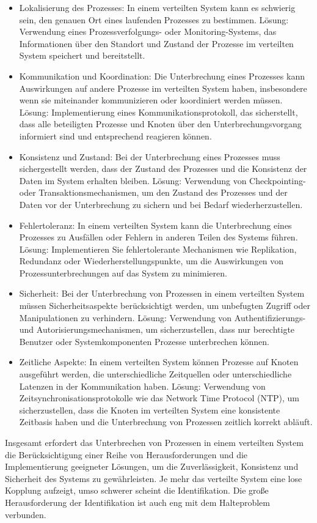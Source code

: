\begin{itemize}
\item Lokalisierung des Prozesses: In einem verteilten System kann es schwierig sein, den genauen Ort eines laufenden Prozesses zu bestimmen. Lösung: Verwendung eines Prozessverfolgungs- oder Monitoring-Systems, das Informationen über den Standort und Zustand der Prozesse im verteilten System speichert und bereitstellt.
\item Kommunikation und Koordination: Die Unterbrechung eines Prozesses kann Auswirkungen auf andere Prozesse im verteilten System haben, insbesondere wenn sie miteinander kommunizieren oder koordiniert werden müssen. Lösung: Implementierung eines Kommunikationsprotokoll, das sicherstellt, dass alle beteiligten Prozesse und Knoten über den Unterbrechungsvorgang informiert sind und entsprechend reagieren können.
\item Konsistenz und Zustand: Bei der Unterbrechung eines Prozesses muss sichergestellt werden, dass der Zustand des Prozesses und die Konsistenz der Daten im System erhalten bleiben. Lösung: Verwendung von Checkpointing- oder Transaktionsmechanismen, um den Zustand des Prozesses und der Daten vor der Unterbrechung zu sichern und bei Bedarf wiederherzustellen.
\item Fehlertoleranz: In einem verteilten System kann die Unterbrechung eines Prozesses zu Ausfällen oder Fehlern in anderen Teilen des Systems führen. Lösung: Implementieren Sie fehlertolerante Mechanismen wie Replikation, Redundanz oder Wiederherstellungspunkte, um die Auswirkungen von Prozessunterbrechungen auf das System zu minimieren.
\item Sicherheit: Bei der Unterbrechung von Prozessen in einem verteilten System müssen Sicherheitsaspekte berücksichtigt werden, um unbefugten Zugriff oder Manipulationen zu verhindern. Lösung: Verwendung von Authentifizierungs- und Autorisierungsmechanismen, um sicherzustellen, dass nur berechtigte Benutzer oder Systemkomponenten Prozesse unterbrechen können.
\item Zeitliche Aspekte: In einem verteilten System können Prozesse auf Knoten ausgeführt werden, die unterschiedliche Zeitquellen oder unterschiedliche Latenzen in der Kommunikation haben. Lösung: Verwendung von Zeitsynchronisationsprotokolle wie das Network Time Protocol (NTP), um sicherzustellen, dass die Knoten im verteilten System eine konsistente Zeitbasis haben und die Unterbrechung von Prozessen zeitlich korrekt abläuft.
\end{itemize}
Insgesamt erfordert das Unterbrechen von Prozessen in einem verteilten System die Berücksichtigung einer Reihe von Herausforderungen und die Implementierung geeigneter Lösungen, um die Zuverlässigkeit, Konsistenz und Sicherheit des Systems zu gewährleisten. Je mehr das verteilte System eine lose Kopplung aufzeigt, umso schwerer scheint die Identifikation. Die große Herausforderung der Identifikation ist auch eng mit dem Halteproblem verbunden.

